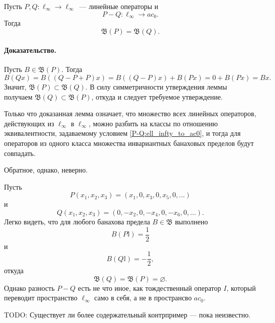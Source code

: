 \begin{lemma}
	Пусть $P,Q:\ell_\infty \to \ell_\infty$~--- линейные операторы и
	\begin{equation}\label{P-Q:ell_infty_to_ac0}
		P-Q : \ell_\infty \to ac_0
		.
	\end{equation}
	Тогда
	\begin{equation}
		\mathfrak{B}(P)=\mathfrak{B}(Q)
		.
	\end{equation}
\end{lemma}

\paragraph{Доказательство.}
Пусть $B\in \mathfrak{B}(P)$.
Тогда
\begin{equation}
	B(Qx) = B((Q-P+P)x) =
	B((Q-P)x)+B(Px) =
	0 + B(Px) =
	Bx
	.
\end{equation}
Значит, $\mathfrak{B}(P) \subset \mathfrak{B}(Q)$.
В силу симметричности утверждения леммы получаем $\mathfrak{B}(Q) \subset \mathfrak{B}(P)$,
откуда и следует требуемое утверждение.

Только что доказанная лемма означает, что множество всех линейных операторов,
действующих из $\ell_\infty$ в $\ell_\infty$, можно разбить на классы по отношению эквивалентности,
задаваемому условием \eqref{P-Q:ell_infty_to_ac0},
и тогда для операторов из одного класса множества инвариантных банаховых пределов будут совпадать.

Обратное, однако, неверно.

\begin{example}
	Пусть
	\begin{equation}
		P(x_1,x_2,x_3) = (x_1, 0, x_3, 0, x_5, 0, ...)
	\end{equation}
	и
	\begin{equation}
		Q(x_1,x_2,x_3) = (0, -x_2, 0, -x_4, 0, -x_6, 0, ...)
		.
	\end{equation}
	Легко видеть, что для любого банахова предела $B\in\mathfrak{B}$ выполнено
	\begin{equation}
		B(P\mathbb{I}) = \frac{1}{2}
	\end{equation}
	и
	\begin{equation}
		B(Q\mathbb{I}) = -\frac{1}{2}
		,
	\end{equation}
	откуда
	\begin{equation}
		\mathfrak{B}(Q) = \mathfrak{B}(P) = \varnothing
		.
	\end{equation}
	Однако разность $P-Q$ есть не что иное, как тождественный оператор $I$,
	который переводит пространство $\ell_\infty$ само в себя,
	а не в пространсво $ac_0$.
\end{example}


TODO:
Существует ли более содержательный контрпример --- пока неизвестно.

